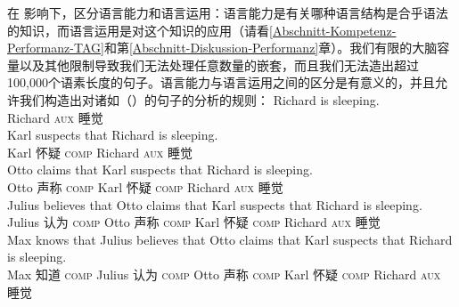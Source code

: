  \citet[\S~I.1]{Chomsky65a}在 \citet{Saussure16a}\nocite{Saussure16a-Fr}影响下，区分语言能力和语言运用：语言能力是有关哪种语言结构是合乎语法的知识，而语言运用是对这个知识的应用（请看\ref{Abschnitt-Kompetenz-Performanz-TAG}和第\ref{Abschnitt-Diskussion-Performanz}章）。我们有限的大脑容量以及其他限制导致我们无法处理任意数量的嵌套，而且我们无法造出超过100,000个语素长度的句子。语言能力与语言运用之间的区分是有意义的，并且允许我们构造出对诸如（）的句子的分析的规则：
\eal 
\label{Beispiel-Satzeinbettung}
\ex 
\gll Richard is sleeping.\\
Richard \textsc{aux} 睡觉\\
\ex 
\gll Karl suspects that Richard is sleeping.\\
Karl 怀疑 \textsc{comp} Richard \textsc{aux} 睡觉\\
\ex 
\gll Otto claims that Karl suspects that Richard is sleeping.\\
Otto 声称 \textsc{comp} Karl 怀疑 \textsc{comp} Richard \textsc{aux} 睡觉\\
\ex 
\gll Julius believes that Otto claims that Karl suspects that Richard is sleeping.\\
Julius 认为 \textsc{comp} Otto 声称 \textsc{comp} Karl 怀疑 \textsc{comp} Richard \textsc{aux} 睡觉\\
\ex 
\gll Max knows that Julius believes that Otto claims that Karl suspects that Richard is sleeping.\\
Max 知道 \textsc{comp} Julius 认为 \textsc{comp} Otto 声称 \textsc{comp} Karl 怀疑 \textsc{comp} Richard \textsc{aux} 睡觉\\
